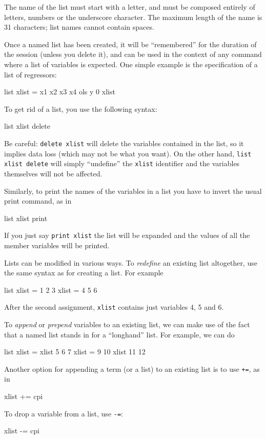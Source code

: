 The name of the list must start with a letter, and must be composed
entirely of letters, numbers or the underscore character.  The maximum
length of the name is 31 characters; list names cannot contain
spaces.  

Once a named list has been created, it will be ``remembered'' for the
duration of the  session (unless you delete it), and can be
used in the context of any  command where a list of
variables is expected.  One simple example is the specification of a
list of regressors:
%
\begin{code}
list xlist = x1 x2 x3 x4
ols y 0 xlist
\end{code}

To get rid of a list, you use the following syntax:
\begin{code}
  list xlist delete
\end{code}
Be careful: \texttt{delete xlist} will delete the variables contained
in the list, so it implies data loss (which may not be what you want).
On the other hand, \texttt{list xlist delete} will simply ``undefine''
the \texttt{xlist} identifier and the variables themselves will not be
affected.

Similarly, to print the names of the variables in a list you have to
invert the usual print command, as in
\begin{code}
  list xlist print
\end{code}
If you just say \texttt{print xlist} the list will be expanded and
the values of all the member variables will be printed.

Lists can be modified in various ways.  To \textit{redefine} an existing
list altogether, use the same syntax as for creating a list.  For
example
%
\begin{code}
list xlist = 1 2 3
xlist = 4 5 6
\end{code}

After the second assignment, \texttt{xlist} contains just variables 4,
5 and 6.

To \textit{append} or \textit{prepend} variables to an existing list,
we can make use of the fact that a named list stands in for a
``longhand'' list.  For example, we can do
%
\begin{code}
list xlist = xlist 5 6 7
xlist = 9 10 xlist 11 12
\end{code}
%
Another option for appending a term (or a list) to an existing list is
to use \texttt{+=}, as in
%
\begin{code}
xlist += cpi
\end{code}
%
To drop a variable from a list, use \texttt{-=}:
%
\begin{code}
xlist -= cpi
\end{code}
%

